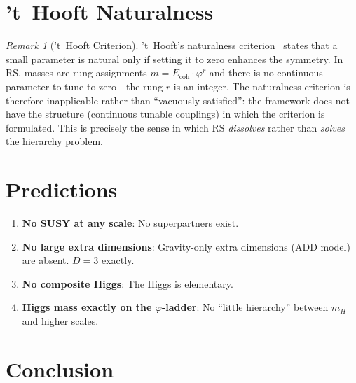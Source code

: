 \documentclass[12pt,a4paper]{article}
\theoremstyle{definition}
\theoremstyle{remark}
\newtheorem{remark}[theorem]{Remark}
\begin{document}
\section{'t~Hooft Naturalness}
\label{sec:thooft}

\begin{remark}['t~Hooft Criterion]
't~Hooft's naturalness criterion~\cite{tHooft1980} states that
a small parameter is natural only if setting it to zero enhances
the symmetry.  In RS, masses are rung assignments
$m = E_{\mathrm{coh}} \cdot \varphi^r$ and there is no continuous
parameter to tune to zero---the rung $r$ is an integer.  The
naturalness criterion is therefore inapplicable rather than
``vacuously satisfied'': the framework does not have the structure
(continuous tunable couplings) in which the criterion is formulated.
This is precisely the sense in which RS \emph{dissolves} rather than
\emph{solves} the hierarchy problem.
\end{remark}

\section{Predictions}
\label{sec:predictions}

\begin{enumerate}
  \item \textbf{No SUSY at any scale}: No superpartners exist.

  \item \textbf{No large extra dimensions}: Gravity-only extra
  dimensions (ADD model) are absent.  $D = 3$ exactly.

  \item \textbf{No composite Higgs}: The Higgs is elementary.

  \item \textbf{Higgs mass exactly on the $\varphi$-ladder}: No
  ``little hierarchy'' between $m_H$ and higher scales.
\end{enumerate}

\section{Conclusion}
\label{sec:conclusion}
\end{document}

